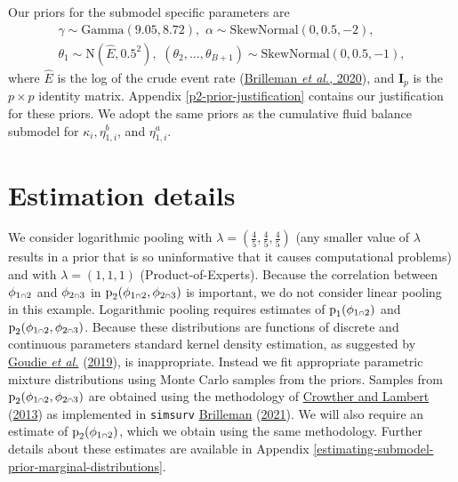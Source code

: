 \documentclass[
  10pt,
  a4paper,
]{article}
\let\Oldcap\cap
\renewcommand{\cap}{\mathrel{\mathsmaller{\Oldcap}}}
\newcommand{\pd}{\text{p}}
\begin{document}
Our priors for the submodel specific parameters are \begin{equation}
\begin{gathered}
  \gamma \sim \text{Gamma}(9.05, 8.72), \, \,
  \alpha \sim \text{SkewNormal}(0, 0.5, -2), \\
  \theta_{1} \sim \text{N}(\hat{E}, 0.5^2), \, \,
  (\theta_{2}, \ldots, \theta_{B + 1}) \sim \text{SkewNormal}(0, 0.5, -1),
  \label{eqn:surv-submodel-prior-def}
\end{gathered}
\end{equation} where \(\hat{E}\) is the log of the crude event rate
(\protect\hyperlink{ref-brilleman_bayesian_2020}{Brilleman \emph{et
al.}, 2020}), and \(\boldsymbol{I}_{p}\) is the \(p \times p\) identity
matrix. Appendix \ref{p2-prior-justification} contains our justification
for these priors. We adopt the same priors as the cumulative fluid
balance submodel for \(\kappa_{i}, \eta_{1, i}^{b}\), and
\(\eta_{1, i}^{a}\).

\hypertarget{estimation-details}{%
\section{Estimation details}\label{estimation-details}}

We consider logarithmic pooling with
\(\lambda = (\frac{4}{5}, \frac{4}{5}, \frac{4}{5})\) (any smaller value
of \(\lambda\) results in a prior that is so uninformative that it
causes computational problems) and with \(\lambda = (1, 1, 1)\)
(Product-of-Experts). Because the correlation between
\(\phi_{1 \cap 2}\) and \(\phi_{2 \cap 3}\) in
\(\pd_{2}(\phi_{1 \cap 2}, \phi_{2 \cap 3})\) is important, we do not
consider linear pooling in this example. Logarithmic pooling requires
estimates of \(\pd_{1}(\phi_{1 \cap 2})\) and
\(\pd_{2}(\phi_{1 \cap 2}, \phi_{2 \cap 3})\). Because these
distributions are functions of discrete and continuous parameters
standard kernel density estimation, as suggested by
\protect\hyperlink{ref-goudie_joining_2019}{Goudie \emph{et al.}}
(\protect\hyperlink{ref-goudie_joining_2019}{2019}), is inappropriate.
Instead we fit appropriate parametric mixture distributions using Monte
Carlo samples from the priors. Samples from
\(\pd_{2}(\phi_{1 \cap 2}, \phi_{2 \cap 3})\) are obtained using the
methodology of \protect\hyperlink{ref-crowther_simulating_2013}{Crowther
and Lambert} (\protect\hyperlink{ref-crowther_simulating_2013}{2013}) as
implemented in \texttt{simsurv}
\protect\hyperlink{ref-brilleman_simsurv_2021}{Brilleman}
(\protect\hyperlink{ref-brilleman_simsurv_2021}{2021}). We will also
require an estimate of \(\pd_{2}(\phi_{1 \cap 2})\), which we obtain
using the same methodology. Further details about these estimates are
available in Appendix
\ref{estimating-submodel-prior-marginal-distributions}.
\end{document}
